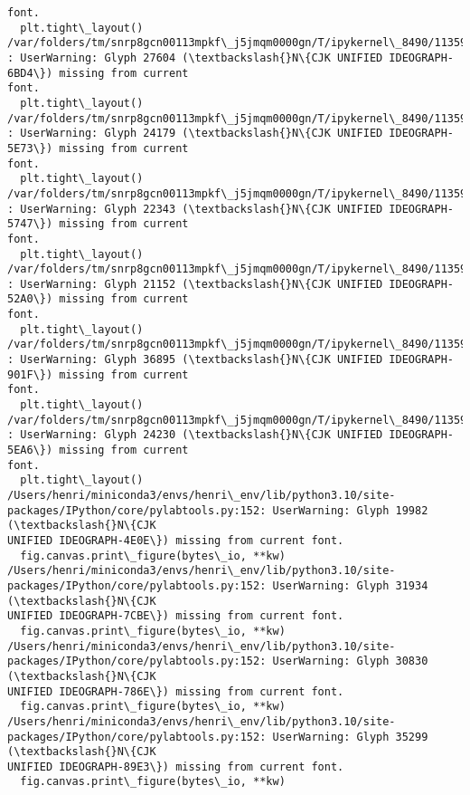 \documentclass[11pt]{article}
\begin{document}
\begin{Verbatim}[commandchars=\\\{\}]
font.
  plt.tight\_layout()
/var/folders/tm/snrp8gcn00113mpkf\_j5jmqm0000gn/T/ipykernel\_8490/1135938699.py:44
: UserWarning: Glyph 27604 (\textbackslash{}N\{CJK UNIFIED IDEOGRAPH-6BD4\}) missing from current
font.
  plt.tight\_layout()
/var/folders/tm/snrp8gcn00113mpkf\_j5jmqm0000gn/T/ipykernel\_8490/1135938699.py:44
: UserWarning: Glyph 24179 (\textbackslash{}N\{CJK UNIFIED IDEOGRAPH-5E73\}) missing from current
font.
  plt.tight\_layout()
/var/folders/tm/snrp8gcn00113mpkf\_j5jmqm0000gn/T/ipykernel\_8490/1135938699.py:44
: UserWarning: Glyph 22343 (\textbackslash{}N\{CJK UNIFIED IDEOGRAPH-5747\}) missing from current
font.
  plt.tight\_layout()
/var/folders/tm/snrp8gcn00113mpkf\_j5jmqm0000gn/T/ipykernel\_8490/1135938699.py:44
: UserWarning: Glyph 21152 (\textbackslash{}N\{CJK UNIFIED IDEOGRAPH-52A0\}) missing from current
font.
  plt.tight\_layout()
/var/folders/tm/snrp8gcn00113mpkf\_j5jmqm0000gn/T/ipykernel\_8490/1135938699.py:44
: UserWarning: Glyph 36895 (\textbackslash{}N\{CJK UNIFIED IDEOGRAPH-901F\}) missing from current
font.
  plt.tight\_layout()
/var/folders/tm/snrp8gcn00113mpkf\_j5jmqm0000gn/T/ipykernel\_8490/1135938699.py:44
: UserWarning: Glyph 24230 (\textbackslash{}N\{CJK UNIFIED IDEOGRAPH-5EA6\}) missing from current
font.
  plt.tight\_layout()
/Users/henri/miniconda3/envs/henri\_env/lib/python3.10/site-
packages/IPython/core/pylabtools.py:152: UserWarning: Glyph 19982 (\textbackslash{}N\{CJK
UNIFIED IDEOGRAPH-4E0E\}) missing from current font.
  fig.canvas.print\_figure(bytes\_io, **kw)
/Users/henri/miniconda3/envs/henri\_env/lib/python3.10/site-
packages/IPython/core/pylabtools.py:152: UserWarning: Glyph 31934 (\textbackslash{}N\{CJK
UNIFIED IDEOGRAPH-7CBE\}) missing from current font.
  fig.canvas.print\_figure(bytes\_io, **kw)
/Users/henri/miniconda3/envs/henri\_env/lib/python3.10/site-
packages/IPython/core/pylabtools.py:152: UserWarning: Glyph 30830 (\textbackslash{}N\{CJK
UNIFIED IDEOGRAPH-786E\}) missing from current font.
  fig.canvas.print\_figure(bytes\_io, **kw)
/Users/henri/miniconda3/envs/henri\_env/lib/python3.10/site-
packages/IPython/core/pylabtools.py:152: UserWarning: Glyph 35299 (\textbackslash{}N\{CJK
UNIFIED IDEOGRAPH-89E3\}) missing from current font.
  fig.canvas.print\_figure(bytes\_io, **kw)
    \end{Verbatim}

    \begin{center}
    \end{center}
    { \hspace*{\fill} \\}
    
\end{document}
